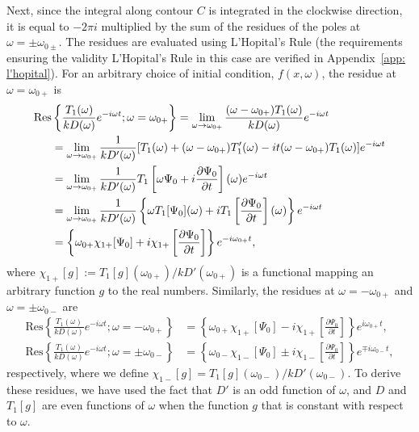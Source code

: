 Next, since the integral along contour $C$ is integrated in the clockwise direction, it is equal to $-2\pi i$ multiplied by the sum of the residues of the poles at $\omega = \pm \omega_{0\pm}$. The residues are evaluated using L'Hopital's Rule (the requirements ensuring the validity L'Hopital's Rule in this case are verified in Appendix~\ref{app: l'hopital}). For an arbitrary choice of initial condition, $f(x,\omega)$, the residue at $\omega = \omega_{0+}$ is
\begin{align}
\mathrm{Res}&\left\{\frac{T_1(\omega)}{kD(\omega)}e^{-i\omega t}; \omega = \omega_{0+} \right\} = 
\lim_{\omega \to \omega_{0+}} \frac{(\omega - \omega_{0+})T_1(\omega)}{kD(\omega)} e^{-i\omega t} \notag \\ 
&= \lim_{\omega \to \omega_{0+}} \frac{1}{kD'(\omega)} [T_1(\omega) + (\omega - \omega_{0+})T'_1(\omega) - it(\omega - \omega_{0+})T_1(\omega)]e^{-i\omega t} \notag \\
&= \lim_{\omega \to \omega_{0+}} \frac{1}{kD'(\omega)} T_1\left[\omega \Psi_0 + i\frac{\partial \Psi_0}{\partial t}\right](\omega) e^{-i\omega t} \notag \\
&= \lim_{\omega \to \omega_{0+}} \frac{1}{kD'(\omega)} \left\{ \omega T_1[\Psi_0](\omega) + iT_1\left[\frac{\partial \Psi_0}{\partial t}\right](\omega) \right\} e^{-i\omega t} \notag \\
&= \left\{ \omega_{0+} \chi_{1+}[\Psi_0] + i\chi_{1+}\left[\frac{\partial \Psi_0}{\partial t}\right] \right\} e^{-i\omega_{0+} t},
\end{align}
where $\chi_{1+}[g] := T_1[g](\omega_{0+}) / kD'(\omega_{0+})$ is a functional mapping an arbitrary function $g$ to the real numbers. Similarly, the residues at $\omega = -\omega_{0+}$ and $\omega = \pm\omega_{0-}$ are
\begin{align}
\mathrm{Res}\left\{\frac{T_1(\omega)}{kD(\omega)}e^{-i\omega t}; \omega = -\omega_{0+} \right\} &= \left\{ \omega_{0+} \chi_{1+}[\Psi_0] - i\chi_{1+}\left[\frac{\partial \Psi_0}{\partial t}\right] \right\} e^{i\omega_{0+} t}, \\
\mathrm{Res}\left\{\frac{T_1(\omega)}{kD(\omega)}e^{-i\omega t}; \omega = \pm \omega_{0-} \right\} &= \left\{ \omega_{0-} \chi_{1-}[\Psi_0] \pm i\chi_{1-}\left[\frac{\partial \Psi_0}{\partial t}\right] \right\} e^{\mp i\omega_{0-} t},
\end{align}
respectively, where we define $\chi_{1-}[g] = T_1[g](\omega_{0-}) / kD'(\omega_{0-})$. To derive these residues, we have used the fact that $D'$ is an odd function of $\omega$, and $D$ and $T_1[g]$ are even functions of $\omega$ when the function $g$ that is constant with respect to $\omega$.

